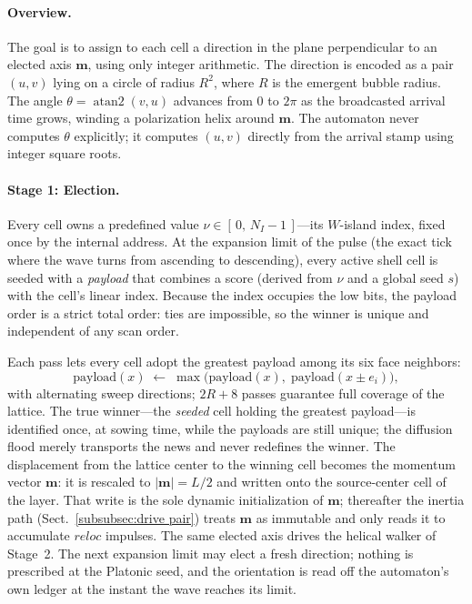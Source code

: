 \documentclass{ijuc}
\begin{document}
\paragraph{Overview.}  The goal is to assign to each cell a direction in the plane perpendicular to an elected axis $\boldsymbol{m}$, using only integer arithmetic.  The direction is encoded as a pair $(u,v)$ lying on a circle of radius $R^2$, where $R$ is the emergent bubble radius.  The angle $\theta = \operatorname{atan2}(v,u)$ advances from $0$ to $2\pi$ as the broadcasted arrival time grows, winding a polarization helix around $\boldsymbol{m}$.  The automaton never computes $\theta$ explicitly; it computes $(u,v)$ directly from the arrival stamp using integer square roots.

\paragraph{Stage 1: Election.}  Every cell owns a predefined value $\nu\in[\,0,\,N_{I}-1\,]$---its $W$-island index, fixed once by the internal address.  At the expansion limit of the pulse (the exact tick where the wave turns from ascending to descending), every active shell cell is seeded with a \emph{payload} that combines a score (derived from $\nu$ and a global seed $s$) with the cell's linear index.  Because the index occupies the low bits, the payload order is a strict total order: ties are impossible, so the winner is unique and independent of any scan order.

Each pass lets every cell adopt the greatest payload among its six face neighbors:
\[
\mathrm{payload}(x)\;\leftarrow\;\max\bigl(\mathrm{payload}(x),\;\mathrm{payload}(x\pm e_i)\bigr),
\]
with alternating sweep directions; $2R+8$ passes guarantee full coverage of the lattice.  The true winner---the \emph{seeded} cell holding the greatest payload---is identified once, at sowing time, while the payloads are still unique; the diffusion flood merely transports the news and never redefines the winner.  The displacement from the lattice center to the winning cell becomes the momentum vector $\boldsymbol{m}$: it is rescaled to $\lvert\boldsymbol{m}\rvert=L/2$ and written onto the source-center cell of the layer.  That write is the sole dynamic initialization of $\boldsymbol{m}$; thereafter the inertia path (Sect.~\ref{subsubsec:drive pair}) treats $\boldsymbol{m}$ as immutable and only reads it to accumulate $\mathit{reloc}$ impulses.  The same elected axis drives the helical walker of Stage~2.  The next expansion limit may elect a fresh direction; nothing is prescribed at the Platonic seed, and the orientation is read off the automaton's own ledger at the instant the wave reaches its limit.
\end{document}
